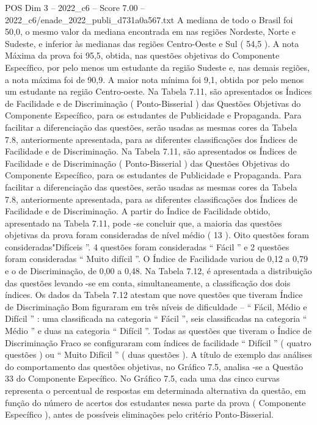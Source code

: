 \begin{textsample}{POS Dim 3 – 2022\_c6 – Score 7.00 – 2022\_c6/enade\_2022\_publi\_d731a0a567.txt}
A mediana de todo o Brasil foi 50,0, o mesmo valor da mediana encontrada em nas regiões Nordeste, Norte e Sudeste, e inferior às medianas das regiões Centro-Oeste e Sul ( 54,5 ).
A nota Máxima da prova foi 95,5, obtida, nas questões objetivas do Componente Específico, por pelo menos um estudante da região Sudeste e, nas demais regiões, a nota máxima foi de 90,9.
A maior nota mínima foi 9,1, obtida por pelo menos um estudante na região Centro-oeste.
Na Tabela 7.11, são apresentados os Índices de Facilidade e de Discriminação ( Ponto-Bisserial ) das Questões Objetivas do Componente Específico, para os estudantes de Publicidade e Propaganda.
Para facilitar a diferenciação das questões, serão usadas as mesmas cores da Tabela 7.8, anteriormente apresentada, para as diferentes classificações dos Índices de Facilidade e de Discriminação.
Na Tabela 7.11, são apresentados os Índices de Facilidade e de Discriminação ( Ponto-Bisserial ) das Questões Objetivas do Componente Específico, para os estudantes de Publicidade e Propaganda.
Para facilitar a diferenciação das questões, serão usadas as mesmas cores da Tabela 7.8, anteriormente apresentada, para as diferentes classificações dos Índices de Facilidade e de Discriminação.
A partir do Índice de Facilidade obtido, apresentado na Tabela 7.11, pode -se concluir que, a maioria das questões objetivas da prova foram consideradas de nível médio ( 13 ).
Oito questões foram consideradas"Difíceis ”. 4 questões foram consideradas “ Fácil ” e 2 questões foram consideradas “ Muito difícil ”.
O Índice de Facilidade variou de 0,12 a 0,79 e o de Discriminação, de 0,00 a 0,48.
Na Tabela 7.12, é apresentada a distribuição das questões levando -se em conta, simultaneamente, a classificação dos dois índices.
Os dados da Tabela 7.12 atestam que nove questões que tiveram Índice de Discriminação Bom figuraram em três níveis de dificuldade – “ Fácil, Médio e Difícil ” : uma classificada na categoria “ Fácil ”, seis classificadas na categoria “ Médio ” e duas na categoria “ Difícil ”.
Todas as questões que tiveram o Índice de Discriminação Fraco se configuraram com índices de facilidade “ Difícil ” ( quatro questões ) ou “ Muito Difícil ” ( duas questões ).
A título de exemplo das análises do comportamento das questões objetivas, no Gráfico 7.5, analisa -se a Questão 33 do Componente Específico.
No Gráfico 7.5, cada uma das cinco curvas representa o percentual de respostas em determinada alternativa da questão, em função do número de acertos dos estudantes nessa parte da prova ( Componente Específico ), antes de possíveis eliminações pelo critério Ponto-Bisserial.

\end{textsample}
